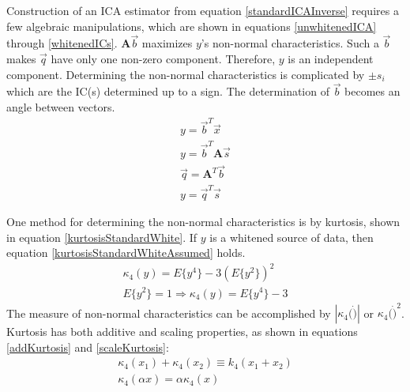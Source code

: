 \documentclass[11pt]{article}
\begin{document}
Construction of an ICA estimator from equation \ref{standardICAInverse} requires a few algebraic manipulations, which are shown in equations \ref{unwhitenedICA} through \ref{whitenedICs}.
$\mathbf{A}\vec{b}$ maximizes $y$'s non-normal characteristics.  Such a $\vec{b}$ makes $\vec{q}$ have only one non-zero component. Therefore, $y$ is an independent component.  Determining the non-normal characteristics is complicated by %
$\pm s_i$ which are the IC(s) determined up to a sign. 
The determination of $\vec{b}$ becomes an angle between vectors.
\begin{eqnarray}
y = \vec{b}^T \vec{x} \label{unwhitenedICA} \\
y = \vec{b}^T \mathbf{A}\vec{s} \\
\vec{q} = \mathbf{A}^{T} \vec{b} \\
y = \vec{q}^T \vec{s} \label{whitenedICs}
\end{eqnarray}

One method for determining the non-normal characteristics is by kurtosis, shown in equation \ref{kurtosisStandardWhite}.  If $y$ is a whitened source of data, then equation \ref{kurtosisStandardWhiteAssumed} holds.
\begin{eqnarray}
\kappa _4 (y) = E \{ y^4 \} - 3 (E\{ y^2\})^2 \label{kurtosisStandardWhite}\\
E\{ y^2\} =1 \Rightarrow \kappa _4 (y) = E \{ y^4 \} - 3 \label{kurtosisStandardWhiteAssumed}%
\end{eqnarray}
The measure of non-normal characteristics can be accomplished by $|\kappa_4(\dot)|$ or $\kappa_4 (\dot) ^2$.  %
Kurtosis has both additive and scaling properties, as shown in equations \ref{addKurtosis} and \ref{scaleKurtosis}:
\begin{eqnarray}
\kappa_4(x_1) + \kappa_4(x_2) \equiv k_4(x_1 + x_2) \label{addKurtosis}\\
\kappa_4(\alpha x) = \alpha \kappa_4 (x) \label{scaleKurtosis}
\end{eqnarray}
\end{document}
